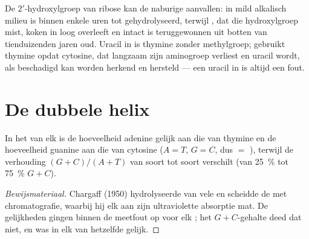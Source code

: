 \begin{example}\label{ex:b1:nucleic-acids:fragile}
De $2'$-hydroxylgroep van ribose kan de naburige  aanvallen:
in mild alkalisch milieu is  binnen enkele uren tot  gehydrolyseerd,
terwijl , dat die hydroxylgroep mist, koken in loog overleeft en intact is
teruggewonnen uit botten van tienduizenden jaren oud. Uracil in  is thymine
zonder methylgroep;  gebruikt thymine opdat cytosine, dat langzaam zijn
aminogroep verliest en uracil wordt, als beschadigd kan worden herkend en hersteld
--- een uracil in  is altijd een fout.
\end{example}

\section{De dubbele helix}

\begin{proposition}\label{prop:b1:nucleic-acids:chargaff}
In het  van elk  is de hoeveelheid adenine gelijk aan die van thymine
en de hoeveelheid guanine aan die van cytosine ($A = T$, $G = C$, dus  $=$
), terwijl de verhouding $(G + C)/(A + T)$ van soort tot soort
verschilt (van \qty{25}{\%} tot \qty{75}{\%} $G + C$).
\end{proposition}
\begin{proof}[Bewijsmateriaal]
Chargaff (1950) hydrolyseerde  van vele  en scheidde de  met
chromatografie, waarbij hij elk aan zijn ultraviolette absorptie mat. De
gelijkheden gingen binnen de meetfout op voor elk ; het $G + C$-gehalte deed
dat niet, en was in elk  van hetzelfde  gelijk.
\end{proof}

